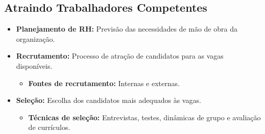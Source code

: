 \documentclass{article}
\begin{document}
\subsection{Atraindo Trabalhadores Competentes}
\begin{itemize}
    \item \textbf{Planejamento de RH:} Previsão das necessidades de mão de obra da organização. 
    \item \textbf{Recrutamento:} Processo de atração de candidatos para as vagas disponíveis. 
    \begin{itemize}
        \item \textbf{Fontes de recrutamento:} Internas e externas. 
    \end{itemize}
    \item \textbf{Seleção:} Escolha dos candidatos mais adequados às vagas. 
    \begin{itemize}
        \item \textbf{Técnicas de seleção:} Entrevistas, testes, dinâmicas de grupo e avaliação de currículos. 
    \end{itemize}
\end{itemize}
\end{document}
